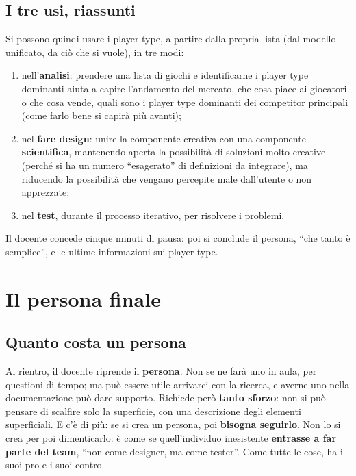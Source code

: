 \subsection{I tre usi, riassunti}

Si possono quindi usare i player type, a partire dalla propria lista (dal modello
unificato, da ciò che si vuole), in tre modi:
\begin{enumerate}
  \item nell'\textbf{analisi}: prendere una lista di giochi e identificarne i player
        type dominanti aiuta a capire l'andamento del mercato, che cosa piace ai
        giocatori o che cosa vende, quali sono i player type dominanti dei
        competitor principali (come farlo bene si capirà più avanti);
  \item nel \textbf{fare design}: unire la componente creativa con una componente
        \textbf{scientifica}, mantenendo aperta la possibilità di soluzioni molto
        creative (perché si ha un numero ``esagerato'' di definizioni da integrare),
        ma riducendo la possibilità che vengano percepite male dall'utente o non
        apprezzate;
  \item nel \textbf{test}, durante il processo iterativo, per risolvere i problemi.
\end{enumerate}
Il docente concede cinque minuti di pausa: poi si conclude il persona, ``che tanto è
semplice'', e le ultime informazioni sui player type.

\section{Il persona finale}
\label{gd18:sec:persona-finale}


\subsection{Quanto costa un persona}

Al rientro, il docente riprende il \textbf{persona}. Non se ne farà uno in aula, per
questioni di tempo; ma può essere utile arrivarci con la ricerca, e averne uno nella
documentazione può dare supporto. Richiede però \textbf{tanto sforzo}: non si può
pensare di scalfire solo la superficie, con una descrizione degli elementi
superficiali. E c'è di più: se si crea un persona, poi \textbf{bisogna seguirlo}.
Non lo si crea per poi dimenticarlo: è come se quell'individuo inesistente
\textbf{entrasse a far parte del team}, ``non come designer, ma come tester''. Come
tutte le cose, ha i suoi pro e i suoi contro.

